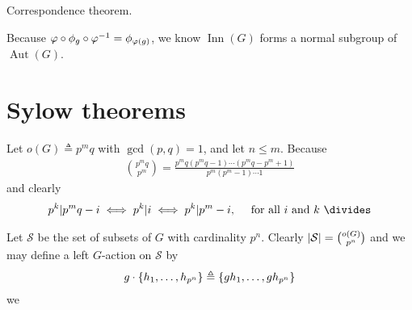 \documentclass{report}
\begin{document}
Correspondence theorem.


Because $ \phi\circ \pfi _g \circ \phi^{-1} = \pfi _{\phi(g)}$, we know $\operatorname{Inn}(G)$ forms a normal subgroup of $\operatorname{Aut}(G)$. \\

\section{Sylow theorems}
Let $o(G)\triangleq p^mq$ with $\operatorname{gcd}(p,q)=1$, and let $n\leq m$. Because 
\begin{align*}
\binom{p^mq}{p^m}= \frac{p^mq(p^mq-1)\cdots (p^mq-p^m+1)}{p^m(p^m-1)\cdots 1}
\end{align*}
and clearly 
\begin{align*}
p^k | p^mq- i \iff p^k |i\iff p^k | p^m-i,\quad \text{ for all $i$ and  $k$ }  \divides
\end{align*}

Let $\mathcal{S}$ be the  set of subsets of $G$ with cardinality  $p^n$. Clearly $\left|\mathcal{S}\right|=\binom{o(G)}{p^n}$ and we may define a left $G$-action on $\mathcal{S}$ by
\begin{align*}
g\cdot \left\{ h_1,\dots ,h_{p^n} \right\} \triangleq \left\{ gh_1,\dots ,gh_{p^n} \right\}
\end{align*}
we 
\end{document}
